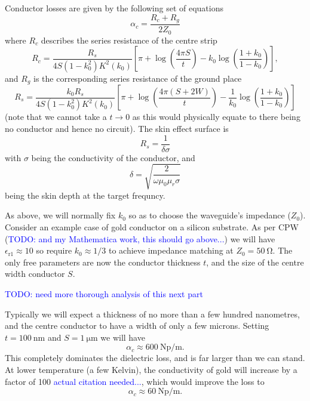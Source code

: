 \documentclass[a4paper]{article}
\newcommand{\cm}[1]{\textcolor{blue}{#1}} %
\begin{document}
Conductor losses are given by the following set of equations\cite{Simons2004}
\begin{equation}
  \alpha_c = \frac{R_c +R_g}{2Z_0}
\end{equation}
where $R_c$ describes the series resistance of the centre strip
\begin{equation}
  R_c = \frac{R_s}{4 S(1-k_0^2)K^2(k_0)}\left[ \pi + \log\left(\frac{4\pi
  S}{t}\right) - k_0\log\left(\frac{1+k_0}{1-k_0}\right) \right],
\end{equation}
and $R_g$ is the corresponding series resistance of the ground place
\begin{equation}
  R_s = \frac{k_0 R_s}{4S(1-k_0^2)K^2(k_0)}\left[\pi +
  \log\left(\frac{4\pi(S+2W)}{t}\right) -
  \frac{1}{k_0}\log\left(\frac{1+k_0}{1-k_0}\right)\right]
\end{equation}
(note that we cannot take a $t\to 0$ as this would physically equate to there
being no conductor and hence no circuit). The skin effect surface is
\begin{equation}
  R_s = \frac{1}{\delta\sigma}
\end{equation}
with $\sigma$ being the conductivity of the conductor, and
\begin{equation}
  \delta = \sqrt{\frac{2}{\omega\mu_0\mu_r\sigma}}
\end{equation}
being the skin depth at the target frequncy.



As above, we will normally fix $k_0$ so as to choose the waveguide's impedance
($Z_0$). Consider an example case of gold conductor on a silicon substrate. As
per CPW\cite{1127105} (\cm{TODO: and my Mathematica work, this should go
above...}) we will have $\epsilon_\mathrm{r1} \approx 10$ so require $k_0
\approx 1/3$ to achieve impedance matching at $Z_0 = \SI{50}{\ohm}$. The only
free parameters are now the conductor thickness $t$, and the size of the centre
width conductor $S$.

\cm{TODO: need more thorough analysis of this next part}

Typically we will expect a thickness of no more than a few hundred nanometres,
and the centre conductor to have a width of only a few microns. Setting
$t=\SI{100}{\nano\metre}$ and $S=\SI{1}{\micro\metre}$ we will have
\begin{equation}
  \alpha_c \approx \SI{600}{\neper \per \meter}.
\end{equation}
This completely dominates the dielectric loss, and is far larger than we can
stand. At lower temperature (a few Kelvin), the conductivity of gold will
increase by a factor of 100 \cm{actual citation needed...}, which would improve
the loss to
\begin{equation}
  \alpha_c \approx \SI{60}{\neper \per \meter}.
\end{equation}
\end{document}
